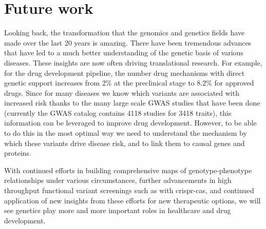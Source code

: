 

\section{Future work}
Looking back, the transformation that the genomics and genetics fields have made over the last 20 years is amazing. There have been tremendous advances that have led to a much better understanding of the genetic basis of various diseases. These insights are now often driving translational research. For example, for the drug development pipeline, the number drug mechanisms with direct genetic support increases from 2\% at the preclinical stage to 8.2\% for approved drugs\cite{nelsonSupportHumanGenetic2015d}. Since for many diseases we know which variants are associated with increased risk thanks to the many large scale GWAS studies that have been done (currently the GWAS catalog\cite{macarthurNewNHGRIEBICatalog2017a} contains 4118 studies for 3418 traits), this information can be leveraged to improve drug development. However, to be able to do this in the most optimal way we need to understand the mechanism by which these variants drive disease risk, and to link them to causal genes and proteins.

With continued efforts in building comprehensive maps of genotype-phenotype relationships under various circumstances, further advancements in high throughput functional variant screenings such as with crispr-cas, and continued application of new insights from these efforts for new therapeutic options, we will see genetics play more and more important roles in healthcare and drug development.

